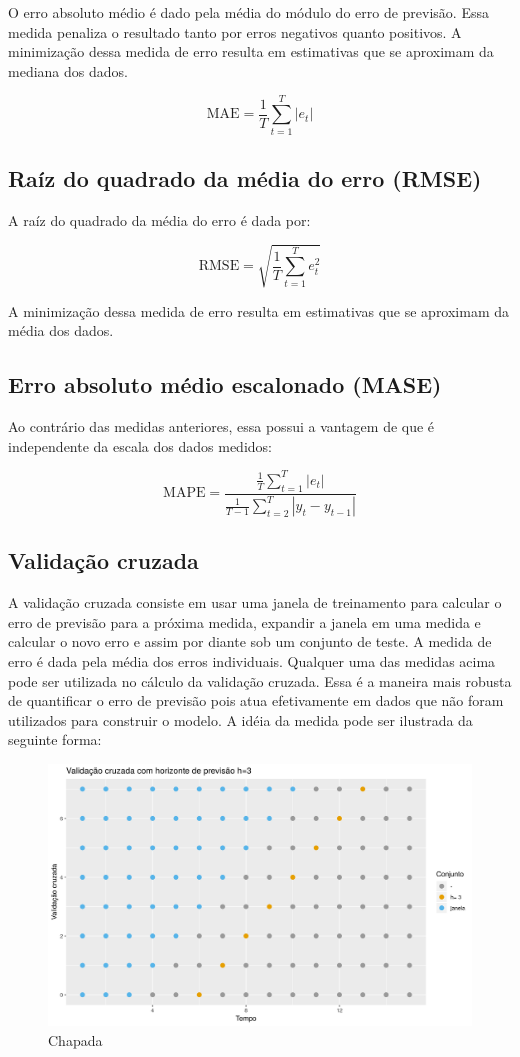 \documentclass[
	12pt,				%
	openright,			%
	oneside,			%
	a4paper,			%
	english,			%
	french,				%
	spanish,			%
	brazil				%
	]{abntex2}
\begin{document}
O erro absoluto médio é dado pela média do módulo do erro de previsão. Essa medida penaliza o resultado tanto por erros negativos quanto positivos. A minimização dessa medida de erro resulta em estimativas que se aproximam da mediana dos dados.

$$\text{MAE} = \frac{1}{T}\sum_{t=1}^{T}\left|e_{t}\right|$$

\subsection{Raíz do quadrado da média do erro (RMSE)}

A raíz do quadrado da média do erro é dada por:

$$\text{RMSE} = \sqrt{\frac{1}{T}\sum_{t=1}^{T}e_{t}^2}$$

A minimização dessa medida de erro resulta em estimativas que se aproximam da média dos dados.

\subsection{Erro absoluto médio escalonado (MASE)}

Ao contrário das medidas anteriores, essa possui a vantagem de que é independente da escala dos dados medidos:

$$\text{MAPE} = \frac{\frac{1}{T}\sum_{t=1}^T\left|e_t\right|}{\frac{1}{T-1}\sum_{t=2}^{T}\left|y_t-y_{t-1}\right|}$$

\subsection{Validação cruzada}

A validação cruzada consiste em usar uma janela de treinamento para calcular o erro de previsão para a próxima medida, expandir a janela em uma medida e calcular o novo erro e assim por diante sob um conjunto de teste. A medida de erro é dada pela média dos erros individuais. Qualquer uma das medidas acima pode ser utilizada no cálculo da validação cruzada. Essa é a maneira mais robusta de quantificar o erro de previsão pois atua efetivamente em dados que não foram utilizados para construir o modelo. A idéia da medida pode ser ilustrada da seguinte forma:

\begin{figure}[h]
    \centering
	\includegraphics[width=\textwidth]{crossh3}
	\caption{Chapada}
\end{figure}
\FloatBarrier
\end{document}
